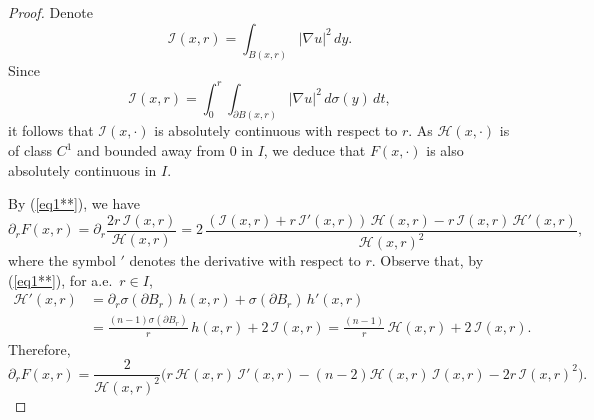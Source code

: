 \documentclass[11pt]{amsart}
\newcommand{\HH}{{\mathcal H}}
\newcommand{\II}{{\mathcal I}}
\newcommand{\rf}[1]{{(\ref{#1})}}
\theoremstyle{definition}
\theoremstyle{remark}
\numberwithin{equation}{section}
\begin{document}
\begin{proof}
Denote
$$\II(x,r) = \int_{B(x,r)} |\nabla u|^2\,dy.$$
Since 
$$\II(x,r) = \int_0^r \int_{\partial B(x,r)}  |\nabla u|^2\,d\sigma(y)\,dt,$$
it follows that  $\II(x,\cdot)$ is absolutely continuous with respect to $r$. As $\HH(x,\cdot)$
is of class $C^1$ and bounded away from $0$ in $I$, we deduce that $F(x,\cdot)$
is also absolutely continuous in $I$.

By \rf{eq1**}, we have
$$
\partial_r F(x,r) = \partial_r \frac{2r\, \II(x,r)}{\HH(x,r)} = 2\,\frac{(\II(x,r) + r\,\II'(x,r))\,\HH(x,r) - r\,\II(x,r)\,\HH'(x,r)}{\HH(x,r)^2},
$$
where the symbol $'$ denotes the derivative with respect to $r$.
Observe that, by \rf{eq1**}, for a.e.\ $r\in I$, 
\begin{align*}
\HH'(x,r) & = \partial_r\sigma(\partial B_r)\,h(x,r) + \sigma(\partial B_r)\,h'(x,r) \\
& = \frac{(n-1)\sigma(\partial B_r)}r\,h(x,r)+
 2\,\II(x,r) = \frac{(n-1)}r\,\HH(x,r) + 2\,\II(x,r).
\end{align*}
Therefore,
\begin{equation}\label{eqderf}
\partial_r F(x,r) = \frac2{\HH(x,r)^2} \Big(r\,\HH(x,r)\,\II'(x,r) - (n-2)\HH(x,r)\,\II(x,r)- 2r\,\II(x,r)^2\Big).
\end{equation}


\end{proof}
\end{document}

